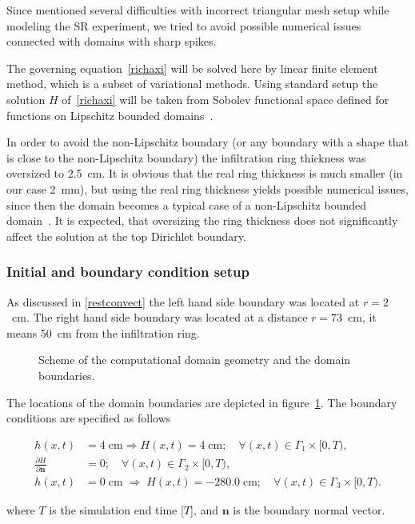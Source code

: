 \documentclass[review]{elsarticle}
\newenvironment{lineq}
    {\begin{linenomath*}
    \begin{equation}
    }
    { 
    \end{equation} 
    \end{linenomath*}
    }
\renewcommand{\vec}{\mathbf}
\begin{document}
Since \cite{Dusek} mentioned several difficulties with incorrect triangular mesh setup while modeling the SR experiment, we tried to avoid possible numerical issues connected with domains with sharp spikes.

The governing equation~\eqref{richaxi} will be solved here by linear finite element method, which is a subset of variational methods. Using standard setup the solution $H$ of~\eqref{richaxi} will be taken from Sobolev functional space defined for functions on Lipschitz bounded domains~\citep{braess, pum}.



In order to avoid the non-Lipschitz boundary (or any boundary with a shape that is close to the non-Lipschitz boundary) the infiltration ring thickness was oversized  to 2.5~cm. It is obvious that the real ring thickness is much smaller (in our case 2~mm), but using the real ring thickness yields possible numerical issues, since then the domain becomes a typical case of a non-Lipschitz bounded domain~\cite{braess}.  It is  expected, that oversizing the ring thickness does not significantly affect the solution at the top Dirichlet boundary. 

\subsubsection{Initial and boundary condition setup}

As discussed in \ref{restconvect} the left hand side boundary was located at $r=2$~cm. The right hand side boundary was located at a distance $r=73$~cm, it means 50~cm from the infiltration ring. 

 \begin{figure}
\centering
{}
 \caption{Scheme of the computational domain geometry and the domain boundaries.}
 \label{valecbc}
\end{figure}


The locations of the domain boundaries are depicted in figure~\ref{valecbc}. The boundary conditions are specified as follows
\begin{lineq} 
\begin{split}
h(x,t) &= 4 \; \mbox{cm} \Rightarrow H(x,t) = 4 \; \mbox{cm}; \quad \forall (x,t) \in \Gamma_1 \times [0,T), \\
\frac{\partial H}{\partial \vec{n}} &= 0; \quad \forall (x,t) \in \Gamma_2 \times [0,T), \\
h(x,t) &= 0  \; \mbox{cm}  \; \Rightarrow \; H(x,t) = -280.0  \; \mbox{cm}; \quad \forall (x,t) \in \Gamma_3 \times [0,T).
\end{split}
\end{lineq}
where $T$ is the simulation end time [$T$], and $\vec{n}$ is the boundary normal vector.
\end{document}
